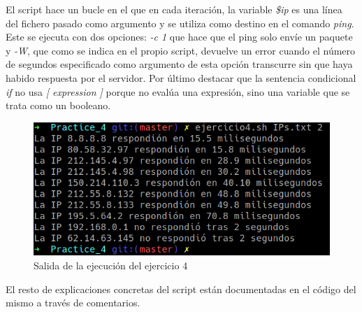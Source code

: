 \documentclass[11pt,a4paper]{article}
\begin{document}
El script hace un bucle en el que en cada iteración, la variable \emph{\$ip} es una línea del fichero pasado como argumento y se utiliza como destino en el comando \emph{ping}. Este se ejecuta con dos opciones: \emph{-c 1} que hace que el ping solo envíe un paquete y \emph{-W}, que como se indica en el propio script, devuelve un error cuando el número de segundos especificado como argumento de esta opción transcurre sin que haya habido respuesta por el servidor. Por último destacar que la sentencia condicional \emph{if} no usa \emph{[ expression ]} porque no evalúa una expresión, sino una variable que se trata como un booleano.

\begin{figure}[ht]
	\centering
	\includegraphics{images/ejercicio4.png}
	\caption{Salida de la ejecución del ejercicio 4}	
\end{figure}

El resto de explicaciones concretas del script están documentadas en el código del mismo a través de comentarios.
\end{document}
